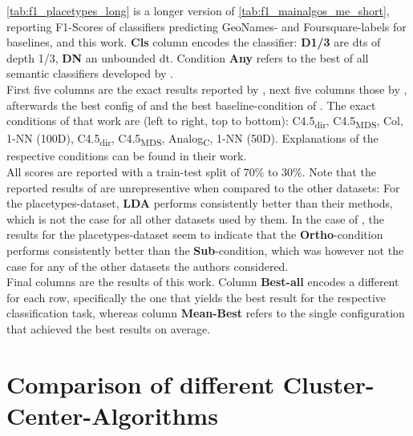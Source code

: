 \autoref{tab:f1_placetypes_long} is a longer version of \autoref{tab:f1_mainalgos_me_short}, reporting F1-Scores of classifiers predicting GeoNames- and Foursquare-labels for baselines, \mainalgos and this work. 
\textbf{Cls} column encodes the classifier: \textbf{D1/3} are \glspl{dt} of depth 1/3, \textbf{DN} an unbounded \gls{dt}. Condition \textbf{Any} refers to the best of all semantic classifiers developed by \cite{Derrac2015}. \\
First five columns are the exact results reported by \cite{Alshaikh2020}, next five columns those by \cite{Ager2018}, afterwards the best config of \cite{Derrac2015} and the best baseline-condition of \cite{Derrac2015}. The exact conditions of that work are (left to right, top to bottom): C4.5\textsubscript{dir}, C4.5\textsubscript{MDS}, Col, 1-NN (100D), C4.5\textsubscript{dir}, C4.5\textsubscript{MDS}, Analog\textsubscript{C}, 1-NN (50D). Explanations of the respective conditions can be found in their work. \\
All scores are reported with a train-test split of 70\% to 30\%. Note that the reported results of \cite{Ager2018} are unrepresentive when compared to the other datasets: For the placetypes-dataset, \textbf{LDA} performs consistently better than their methods, which is not the case for all other datasets used by them. In the case of \cite{Alshaikh2020}, the results for the placetypes-dataset seem to indicate that the \textbf{Ortho}-condition performs consistently better than the \textbf{Sub}-condition, which was however not the case for any of the other datasets the authors considered. \\
Final columns are the results of this work. Column \textbf{Best-all} encodes a different for each row, specifically the one that yields the best result for the respective classification task, whereas column \textbf{Mean-Best} refers to the single configuration that achieved the best results on average. 

\section{Comparison of different Cluster-Center-Algorithms}


